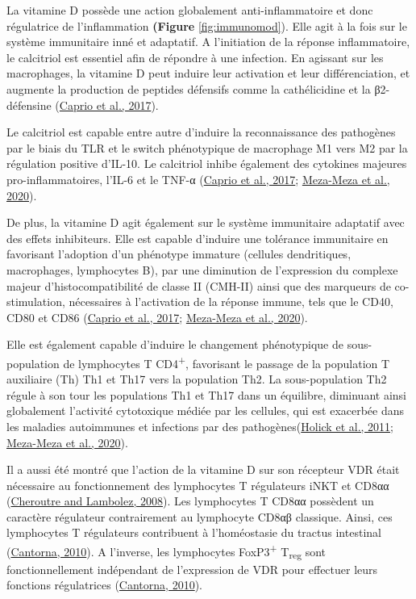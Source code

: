 \documentclass[
  a4paper,
  DIV=11,
  numbers=noendperiod,
  listof=totoc]{scrreprt}
\begin{document}
La vitamine D possède une action globalement anti-inflammatoire et donc
régulatrice de l'inflammation \textbf{(Figure} \ref{fig:immunomod}).
Elle agit à la fois sur le système immunitaire inné et adaptatif. A
l'initiation de la réponse inflammatoire, le calcitriol est essentiel
afin de répondre à une infection. En agissant sur les macrophages, la
vitamine D peut induire leur activation et leur différenciation, et
augmente la production de peptides défensifs comme la cathélicidine et
la β2-défensine (\protect\hyperlink{ref-Caprio.2017}{Caprio et al.,
2017}).

Le calcitriol est capable entre autre d'induire la reconnaissance des
pathogènes par le biais du TLR et le switch phénotypique de macrophage
M1 vers M2 par la régulation positive d'IL-10. Le calcitriol inhibe
également des cytokines majeures pro-inflammatoires, l'IL-6 et le TNF-α
(\protect\hyperlink{ref-Caprio.2017}{Caprio et al., 2017};
\protect\hyperlink{ref-Meza-Meza.2020}{Meza-Meza et al., 2020}).

De plus, la vitamine D agit également sur le système immunitaire
adaptatif avec des effets inhibiteurs. Elle est capable d'induire une
tolérance immunitaire en favorisant l'adoption d'un phénotype immature
(cellules dendritiques, macrophages, lymphocytes B), par une diminution
de l'expression du complexe majeur d'histocompatibilité de classe II
(CMH-II) ainsi que des marqueurs de co-stimulation, nécessaires à
l'activation de la réponse immune, tels que le CD40, CD80 et CD86
(\protect\hyperlink{ref-Caprio.2017}{Caprio et al., 2017};
\protect\hyperlink{ref-Meza-Meza.2020}{Meza-Meza et al., 2020}).

Elle est également capable d'induire le changement phénotypique de
sous-population de lymphocytes T CD4\textsuperscript{+}, favorisant le
passage de la population T auxiliaire (Th) Th1 et Th17 vers la
population Th2. La sous-population Th2 régule à son tour les populations
Th1 et Th17 dans un équilibre, diminuant ainsi globalement l'activité
cytotoxique médiée par les cellules, qui est exacerbée dans les maladies
autoimmunes et infections par des
pathogènes(\protect\hyperlink{ref-Holick.2011}{Holick et al., 2011};
\protect\hyperlink{ref-Meza-Meza.2020}{Meza-Meza et al., 2020}).

Il a aussi été montré que l'action de la vitamine D sur son récepteur
VDR était nécessaire au fonctionnement des lymphocytes T régulateurs
iNKT et CD8αα (\protect\hyperlink{ref-Cheroutre.2008}{Cheroutre and
Lambolez, 2008}). Les lymphocytes T CD8αα possèdent un caractère
régulateur contrairement au lymphocyte CD8αβ classique. Ainsi, ces
lymphocytes T régulateurs contribuent à l'homéostasie du tractus
intestinal (\protect\hyperlink{ref-Cantorna.2010}{Cantorna, 2010}). A
l'inverse, les lymphocytes FoxP3\textsuperscript{+} T\textsubscript{reg}
sont fonctionnellement indépendant de l'expression de VDR pour effectuer
leurs fonctions régulatrices
(\protect\hyperlink{ref-Cantorna.2010}{Cantorna, 2010}).
\end{document}

